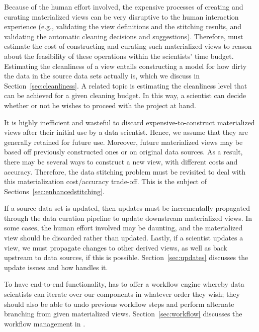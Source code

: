   Because of the human effort involved, the expensive processes of creating and curating materialized views  can be very disruptive to the human interaction experience (e.g., validating the view definitions and the stitching results, and validating the automatic cleaning decisions and suggestions).  Therefore, \dcv must estimate the cost of constructing and curating such materialized views  to reason about the feasibility of these operations within the scientists' time budget.  Estimating the cleanliness of a view  entails constructing a model for how dirty the data in the source data sets actually is, which we discuss in Section~\ref{sec:cleanliness}. A related topic is estimating the cleanliness level that can be achieved for a given cleaning budget.  In this way, a scientist can decide
whether or not he wishes to proceed with the project at hand.

 It is highly inefficient and wasteful to  discard expensive-to-construct materialized views after their initial use by a data scientist.  Hence, we assume that they are generally retained for future use.  Moreover, future materialized views  may be based off previously constructed ones or on original data sources.  As a result, there may be several ways to construct a new view, with different  costs and accuracy. Therefore, the data stitching problem must be revisited to deal with this materialization cost/accuracy trade-off.  This is the subject of Sections~\ref{sec:enhancedstitching}.

  If a source data set is updated, then
updates must be incrementally propagated through the data curation pipeline to
update downstream materialized views.  In some cases, the human effort involved may be
daunting, and the materialized view should be discarded rather than updated.  Lastly, if a
scientist updates a view, we must propagate changes to other derived views, as well as back upstream to data sources, if this is possible. Section~\ref{sec:updates} discusses the update issues and how \dcv handles it.

\stitle{[Workflow]} To have end-to-end functionality, \dcv has to offer a workflow engine whereby data scientists can iterate over our components in whatever order they wish; they should also be able to undo previous workflow steps and perform alternate branching from given materialized views. Section~\ref{sec:workflow} discusses the  workflow management in \dcv.

